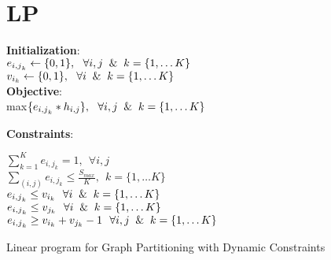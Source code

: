 \documentclass[13pt, letterpaper]{article}
\begin{document}
\section{LP}
\begin{algorithm}[H]

\SetAlgoLined
{}
 \vspace*{.1cm}
 \vspace*{.1cm}
 \textbf{Initialization}: \\
 $e_{{i,j}_k} \leftarrow \{0,1\}, \ \  \forall i,j \And k = \{1, \dots K\} $\\
 $v_{i_{k}} \leftarrow \{0,1\}, \ \ \forall i \And k = \{1, \dots K\}$\\ 
  \vspace*{.1cm}
 \textbf{Objective}: \\
 max$\{e_{{i,j}_{k}} * h_{i,j}\}, \ \ \forall i,j \And k = \{1, \dots K\}$

  \vspace*{.1cm}
 \textbf{Constraints}:

 \vspace*{.1cm}
$\sum_{k = 1}^{K} e_{{i,j}_{k}} = 1, \ \  \forall i,j $ \\
$\sum_{(i,j)} e_{{i,j}_{k}} \leq \frac{S_{max}}{K}, \ \ k = \{1, \dots K\}$\\
$e_{{i,j}_{k}} \leq v_{i_{k}} \ \ \forall i \And k = \{1, \dots K\}$ \\ 
$e_{{i,j}_{k}} \leq v_{j_{k}} \ \ \forall i \And k = \{1, \dots K\}$\\
$e_{{i,j}_{k}} \geq v_{i_{k}} +  v_{j_{k}} -1 \ \ \forall i,j \And k = \{1, \dots K\}$
 \caption{Linear program for Graph Partitioning with Dynamic Constraints}
\end{algorithm}









\label{totalpag} 
\end{document}
